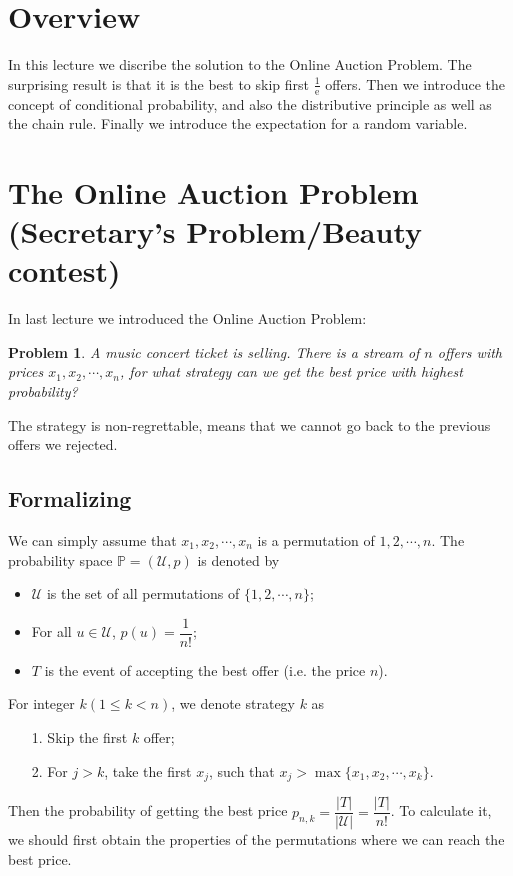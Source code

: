 \documentclass{scribe}
\theoremstyle{plain}
\newtheorem{problem}[theorem]{Problem}
\theoremstyle{empty}
\begin{document}
\notetitle
    
\section{Overview}
In this lecture we discribe the solution to the Online Auction Problem. The surprising result is that it is the best to skip first $\frac{1}{\text{e}}$ offers. Then we introduce the concept of conditional probability, and also the distributive principle as well as the chain rule. Finally we introduce the expectation for a random variable. 
    
\section{The Online Auction Problem (Secretary's Problem/Beauty contest)}
    
In last lecture we introduced the Online Auction Problem:
    
\begin{problem}
    A music concert ticket is selling. There is a stream of $n$ offers with prices $x_1,x_2,\cdots,x_n$, for what strategy can we get the best price with highest probability?
\end{problem}

\begin{remark}
    The strategy is non-regrettable, means that we cannot go back to the previous offers we rejected.
\end{remark}

\subsection{Formalizing}

We can simply assume that $x_1,x_2,\cdots,x_n$ is a permutation of $1,2,\cdots,n$. The probability space $\mathbb{P}=(\mathcal{U},p)$ is denoted by
\begin{itemize}
    \item $\mathcal{U}$ is the set of all permutations of $\{1,2,\cdots,n\}$;
    \item For all $u\in \mathcal{U}$, $p(u)=\dfrac{1}{n!}$;
    \item $T$ is the event of accepting the best offer (i.e. the price $n$).
\end{itemize}

For integer $k(1\le k<n)$, we denote strategy $k$ as
\begin{itemize}
    \item[1.] Skip the first $k$ offer;
    \item[2.] For $j>k$, take the first $x_j$, such that $x_j>\max\{x_1,x_2,\cdots,x_k\}$.
\end{itemize}
Then the probability of getting the best price $p_{n,k}=\dfrac{|T|}{|\mathcal{U}|}=\dfrac{|T|}{n!}$. To calculate it, we should first obtain the properties of the permutations where we can reach the best price.
\end{document}
